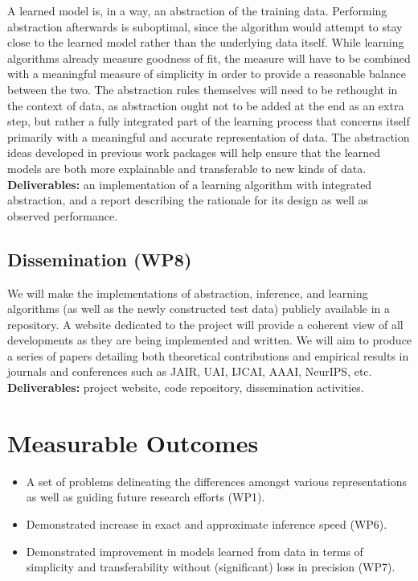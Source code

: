 \documentclass{article}
\begin{document}
A learned model is, in a way, an abstraction of the training data. Performing
abstraction afterwards is suboptimal, since the algorithm would attempt to
stay close to the learned model rather than the underlying data itself. While
learning algorithms already measure goodness of fit, the measure will have to be
combined with a meaningful measure of simplicity in order to provide a
reasonable balance between the two. The abstraction rules themselves will need
to be rethought in the context of data, as abstraction ought not to be added at
the end as an extra step, but rather a fully integrated part of the learning
process that concerns itself primarily with a meaningful and accurate
representation of data. The abstraction ideas developed in previous work
packages will help ensure that the learned models are both more explainable and
transferable to new kinds of data. \textbf{Deliverables:} an implementation of a
learning algorithm with integrated abstraction, and a report describing the
rationale for its design as well as observed performance.

\subsection{Dissemination (WP8)}

We will make the implementations of abstraction, inference, and learning
algorithms (as well as the newly constructed test data) publicly available in a
repository. A website dedicated to the project will provide a coherent view of
all developments as they are being implemented and written. We will aim to
produce a series of papers detailing both theoretical contributions and
empirical results in journals and conferences such as JAIR, UAI, IJCAI, AAAI,
NeurIPS, etc. \textbf{Deliverables:} project website, code repository,
dissemination activities.

\section{Measurable Outcomes}

\begin{itemize}
\item A set of problems delineating the differences amongst various
  representations as well as guiding future research efforts (WP1).
\item Demonstrated increase in exact and approximate inference speed (WP6).
\item Demonstrated improvement in models learned from data in terms of
  simplicity and transferability without (significant) loss in precision (WP7).
\end{itemize}
\end{document}
